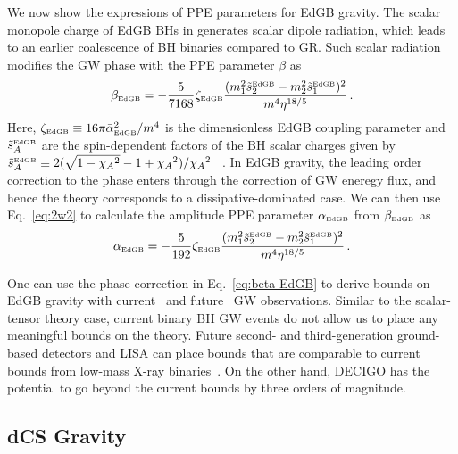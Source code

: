 \documentclass[prd,twocolumn,nofootinbib]{revtex4-1}
\newcommand{\EDGB}{{\mbox{\tiny EdGB}}}
\begin{document}
We now show the expressions of PPE parameters for EdGB gravity. The scalar monopole charge of EdGB BHs in  generates scalar dipole radiation, which leads to an earlier coalescence of BH binaries compared to GR. Such scalar radiation modifies the GW phase with the PPE parameter $\beta$ as~\cite{Yunes:2016jcc,Yagi:2011xp}
\begin{equation}
\label{eq:beta-EdGB}
 \beta_\EDGB=-\frac{5}{7168}\zeta_\EDGB\frac{(m_1^2\tilde s_2^\EDGB-m_2^2\tilde s_1^\EDGB)^2}{m^4\eta^{18/5}}\,.
 \end{equation}
 Here, $\zeta_\EDGB\equiv 16 \pi \bar{\alpha}_\EDGB^2/m^4$ is the dimensionless EdGB coupling parameter and $\tilde s_{A}^\EDGB$ are the spin-dependent factors of the BH scalar charges given by $\tilde s_{A}^\EDGB\equiv 2(\sqrt{1-{\chi_A}^2}-1+{\chi_A}^2)/{\chi_A}^2~$~\cite{Berti:2018cxi,Prabhu:2018aun}. In EdGB gravity, the leading order correction to the phase enters through the correction of GW eneregy flux, and hence the theory corresponds to a dissipative-dominated case. We can then use Eq.~\eqref{eq:2w2} to calculate the amplitude PPE parameter $\alpha_\EDGB$ from $\beta_\EDGB$ as  
 \begin{equation}
 \alpha_\EDGB=-\frac{5}{192}\zeta_\EDGB\frac{(m_1^2 \tilde s_2^\EDGB-m_2^2 \tilde s_1^\EDGB)^2}{m^4\eta^{18/5}}\,.
 \end{equation}
 
 One can use the phase correction in Eq.~\eqref{eq:beta-EdGB} to derive bounds on EdGB gravity with current~\cite{Yunes:2016jcc} and future~\cite{Yagi:2012gp} GW observations. Similar to the scalar-tensor theory case, current binary BH GW events do not allow us to place any meaningful bounds on the theory. Future second- and third-generation ground-based detectors and LISA can place bounds that are comparable to current bounds from low-mass X-ray binaries~\cite{Yagi:2012gp}. On the other hand, DECIGO has the potential to go beyond the current bounds by three orders of magnitude.
 
  \subsection{dCS Gravity}
  
\end{document}
